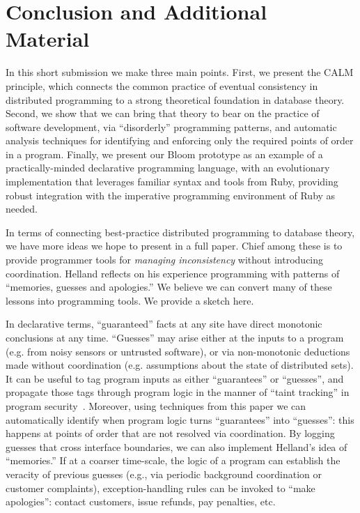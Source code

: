 \section{Conclusion and Additional Material}
\label{sec:conclusion}
In this short submission we make three main points.  First, we present the CALM principle, which connects the common practice of eventual consistency in distributed programming to a strong theoretical foundation in database theory.  Second, we show that we can bring that theory to bear on the practice of software development, via ``disorderly'' programming patterns, and automatic analysis techniques for  identifying and enforcing only the required points of order in a program. Finally, we present our Bloom prototype as an example of a practically-minded declarative programming language, with an evolutionary implementation that leverages familiar syntax and tools from Ruby, providing robust integration with the imperative programming environment of Ruby as needed.

In terms of connecting best-practice distributed programming to database theory, we have more ideas we hope to present in a full paper.  Chief among these is to provide programmer tools for \emph{managing inconsistency} without introducing coordination.  Helland reflects on his experience programming with patterns of ``memories, guesses and apologies.''  We believe we can convert many of these lessons into programming tools.  We provide a sketch here.

In declarative terms, ``guaranteed'' facts at any site have direct monotonic conclusions at any time.  ``Guesses'' may arise either at the inputs to a program (e.g. from noisy sensors or untrusted software), or via non-monotonic deductions made without coordination (e.g. assumptions about the state of distributed sets).  It can be useful to tag program inputs as either ``guarantees'' or ``guesses'', and propagate those tags through program logic in the manner of ``taint tracking'' in program security~\cite{taint}.  Moreover, using techniques from this paper we can automatically identify when program logic turns ``guarantees'' into ``guesses'': this happens at points of order that are not resolved via coordination.    
By logging guesses that cross interface boundaries, we can also implement Helland's idea of ``memories.''  If at a coarser time-scale, the logic of a program can establish the veracity of previous guesses (e.g., via periodic background coordination or customer complaints), exception-handling rules can be invoked to ``make apologies'': contact customers, issue refunds, pay penalties, etc.


